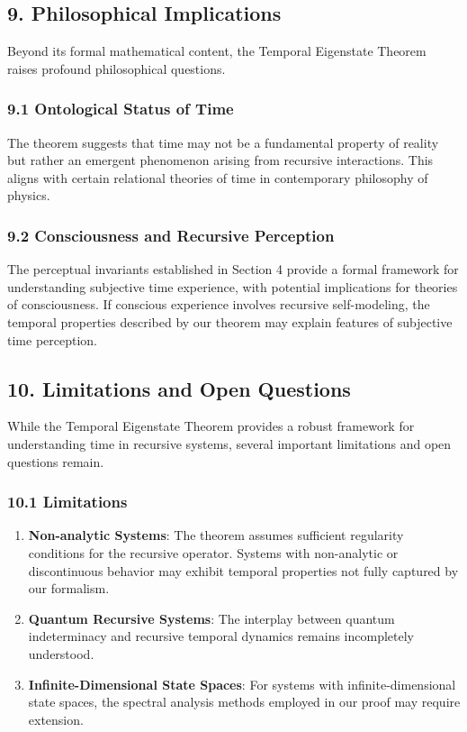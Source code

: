 \documentclass[
]{article}
\begin{document}
\subsection{9. Philosophical
Implications}\label{philosophical-implications}

Beyond its formal mathematical content, the Temporal Eigenstate Theorem
raises profound philosophical questions.

\subsubsection{9.1 Ontological Status of
Time}\label{ontological-status-of-time}

The theorem suggests that time may not be a fundamental property of
reality but rather an emergent phenomenon arising from recursive
interactions. This aligns with certain relational theories of time in
contemporary philosophy of physics.

\subsubsection{9.2 Consciousness and Recursive
Perception}\label{consciousness-and-recursive-perception}

The perceptual invariants established in Section 4 provide a formal
framework for understanding subjective time experience, with potential
implications for theories of consciousness. If conscious experience
involves recursive self-modeling, the temporal properties described by
our theorem may explain features of subjective time perception.

\subsection{10. Limitations and Open
Questions}\label{limitations-and-open-questions}

While the Temporal Eigenstate Theorem provides a robust framework for
understanding time in recursive systems, several important limitations
and open questions remain.

\subsubsection{10.1 Limitations}\label{limitations}

\begin{enumerate}
\def\labelenumi{\arabic{enumi}.}
\item
  \textbf{Non-analytic Systems}: The theorem assumes sufficient
  regularity conditions for the recursive operator. Systems with
  non-analytic or discontinuous behavior may exhibit temporal properties
  not fully captured by our formalism.
\item
  \textbf{Quantum Recursive Systems}: The interplay between quantum
  indeterminacy and recursive temporal dynamics remains incompletely
  understood.
\item
  \textbf{Infinite-Dimensional State Spaces}: For systems with
  infinite-dimensional state spaces, the spectral analysis methods
  employed in our proof may require extension.
\end{enumerate}
\end{document}
